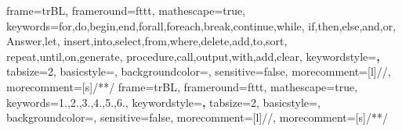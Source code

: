 	{frame=trBL,
	frameround=fttt,
	mathescape=true,
	keywords={for,do,begin,end,forall,foreach,break,continue,while,
            if,then,else,and,or,
            Answer,let,
            insert,into,select,from,where,delete,add,to,sort,
            repeat,until,on,generate,
            procedure,call,output,with,add,clear},
	keywordstyle=\textbf,
	tabsize=2,
	basicstyle=\small,
	backgroundcolor=\color{green!2!white},
	sensitive=false,
	morecomment=[l]{//},
	morecomment=[s]{/*}{*/}%
	}
	{frame=trBL,
	frameround=fttt,
	mathescape=true,
  keywords={1.,2.,3.,4.,5.,6.},
	keywordstyle=\textbf,
	tabsize=2,
	basicstyle=\small,
	backgroundcolor=\color{green!2!white},
	sensitive=false,
	morecomment=[l]{//},
	morecomment=[s]{/*}{*/}%
	}
\lstset{language=pseudocodigo}




\usepackage{dtklogos} %



\usepackage{longtable}

\usepackage{amsthm}
\usepackage{thmtools}

\newtheorem{Definition}{Definición}
\newtheorem{Lemma}{Lema}


\usepackage{afterpage}

\def\BibTeX{\textsc{Bib}\TeX}

